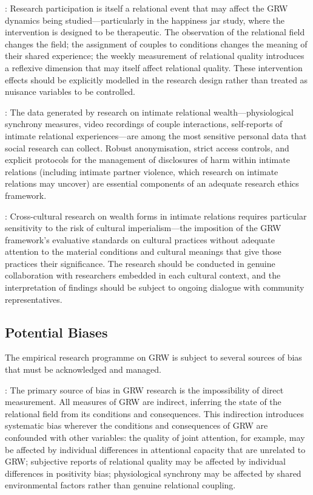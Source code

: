 : Research participation is itself a relational event that may affect the GRW dynamics being studied---particularly in the happiness jar study, where the intervention is designed to be therapeutic. The observation of the relational field changes the field; the assignment of couples to conditions changes the meaning of their shared experience; the weekly measurement of relational quality introduces a reflexive dimension that may itself affect relational quality. These intervention effects should be explicitly modelled in the research design rather than treated as nuisance variables to be controlled.

: The data generated by research on intimate relational wealth---physiological synchrony measures, video recordings of couple interactions, self-reports of intimate relational experiences---are among the most sensitive personal data that social research can collect. Robust anonymisation, strict access controls, and explicit protocols for the management of disclosures of harm within intimate relations (including intimate partner violence, which research on intimate relations may uncover) are essential components of an adequate research ethics framework.

: Cross-cultural research on wealth forms in intimate relations requires particular sensitivity to the risk of cultural imperialism---the imposition of the GRW framework's evaluative standards on cultural practices without adequate attention to the material conditions and cultural meanings that give those practices their significance. The research should be conducted in genuine collaboration with researchers embedded in each cultural context, and the interpretation of findings should be subject to ongoing dialogue with community representatives.

\subsection{Potential Biases}
\label{p15:subsec:biases}

\noindent
The empirical research programme on GRW is subject to several sources of bias that must be acknowledged and managed.

: The primary source of bias in GRW research is the impossibility of direct measurement. All measures of GRW are indirect, inferring the state of the relational field from its conditions and consequences. This indirection introduces systematic bias wherever the conditions and consequences of GRW are confounded with other variables: the quality of joint attention, for example, may be affected by individual differences in attentional capacity that are unrelated to GRW; subjective reports of relational quality may be affected by individual differences in positivity bias; physiological synchrony may be affected by shared environmental factors rather than genuine relational coupling.

